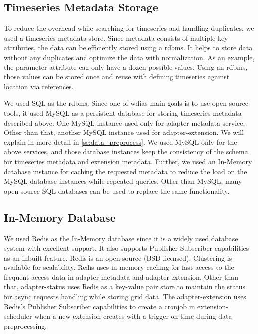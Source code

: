 \subsection{Timeseries Metadata Storage}
\label{subse:mysql}

To reduce the overhead while searching for timeseries and handling duplicates, we used a timeseries metadata store. Since metadata consists of multiple key attributes, the data can be efficiently stored using a \acrfull{rdbms}. It helps to store data without any duplicates and optimize the data with normalization. As an example, the parameter attribute can only have a dozen possible values. Using an \acrshort{rdbms}, those values can be stored once and reuse with defining timeseries against location via references.

We used SQL as the \acrshort{rdbms}. Since one of \acrshort{wdias} main goals is to use open source tools, it used MySQL as a persistent database for storing timeseries metadata described above. One MySQL instance used only for adapter-metadata service. Other than that, another MySQL instance used for adapter-extension. We will explain in more detail in \cref{se:data_preprocess}. We used MySQL only for the above services, and those database instances keep the consistency of the schema for timeseries metadata and extension metadata. Further, we used an In-Memory database instance for caching the requested metadata to reduce the load on the MySQL database instances while repeated queries. Other than MySQL, many open-source SQL databases can be used to replace the same functionality.

\subsection{In-Memory Database}
\label{subse:redis}

We used Redis \cite{redisRedisDocumentation} as the In-Memory database since it is a widely used database system with excellent support. It also supports Publisher Subscriber capabilities as an inbuilt feature. Redis is an open-source (BSD licensed). Clustering is available for scalability. Redis uses in-memory caching for fast access to the frequent access data in adapter-metadata and adapter-extension. Other than that, adapter-status uses Redis as a key-value pair store to maintain the status for async requests handling while storing grid data. The adapter-extension uses Redis's Publisher Subscriber capabilities to create a cronjob in extension-scheduler when a new extension creates with a trigger on time during data preprocessing.

